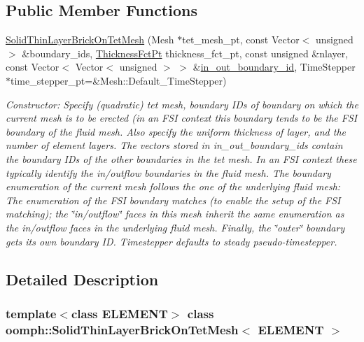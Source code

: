 \subsection*{Public Member Functions}
\begin{DoxyCompactItemize}
\item 
\hyperlink{classoomph_1_1SolidThinLayerBrickOnTetMesh_ac06a05511ae55f0d554e940789661de1}{Solid\+Thin\+Layer\+Brick\+On\+Tet\+Mesh} (Mesh $\ast$tet\+\_\+mesh\+\_\+pt, const Vector$<$ unsigned $>$ \&boundary\+\_\+ids, \hyperlink{classoomph_1_1SolidThinLayerBrickOnTetMesh_ae4289650b0c0eccb2fd3d661b85e85ee}{Thickness\+Fct\+Pt} thickness\+\_\+fct\+\_\+pt, const unsigned \&nlayer, const Vector$<$ Vector$<$ unsigned $>$ $>$ \&\hyperlink{classoomph_1_1ThinLayerBrickOnTetMesh_a3cfd55eb5bbd6801e9d4cd271e602cd8}{in\+\_\+out\+\_\+boundary\+\_\+id}, Time\+Stepper $\ast$time\+\_\+stepper\+\_\+pt=\&Mesh\+::\+Default\+\_\+\+Time\+Stepper)
\begin{DoxyCompactList}\small\item\em Constructor\+: Specify (quadratic) tet mesh, boundary I\+Ds of boundary on which the current mesh is to be erected (in an F\+SI context this boundary tends to be the F\+SI boundary of the fluid mesh. Also specify the uniform thickness of layer, and the number of element layers. The vectors stored in in\+\_\+out\+\_\+boundary\+\_\+ids contain the boundary I\+Ds of the other boundaries in the tet mesh. In an F\+SI context these typically identify the in/outflow boundaries in the fluid mesh. The boundary enumeration of the current mesh follows the one of the underlying fluid mesh\+: The enumeration of the F\+SI boundary matches (to enable the setup of the F\+SI matching); the \char`\"{}in/outflow\char`\"{} faces in this mesh inherit the same enumeration as the in/outflow faces in the underlying fluid mesh. Finally, the \char`\"{}outer\char`\"{} boundary gets its own boundary ID. Timestepper defaults to steady pseudo-\/timestepper. \end{DoxyCompactList}\end{DoxyCompactItemize}


\subsection{Detailed Description}
\subsubsection*{template$<$class E\+L\+E\+M\+E\+NT$>$\newline
class oomph\+::\+Solid\+Thin\+Layer\+Brick\+On\+Tet\+Mesh$<$ E\+L\+E\+M\+E\+N\+T $>$}

